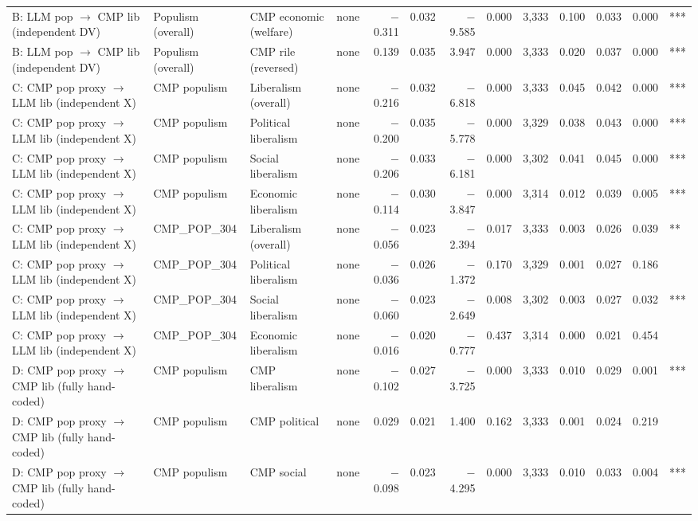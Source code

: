 \begin{table}[ht]
{\begin{tabular}{llllrrrrrrrrl}
B: LLM pop $\rightarrow$ CMP lib (independent DV) & Populism (overall) & CMP economic (welfare) & none & $-$0.311 & 0.032 & $-$9.585 & 0.000 & 3,333 & 0.100 & 0.033 & 0.000 & *** \\
B: LLM pop $\rightarrow$ CMP lib (independent DV) & Populism (overall) & CMP rile (reversed) & none & 0.139 & 0.035 & 3.947 & 0.000 & 3,333 & 0.020 & 0.037 & 0.000 & *** \\
C: CMP pop proxy $\rightarrow$ LLM lib (independent X) & CMP populism & Liberalism (overall) & none & $-$0.216 & 0.032 & $-$6.818 & 0.000 & 3,333 & 0.045 & 0.042 & 0.000 & *** \\
C: CMP pop proxy $\rightarrow$ LLM lib (independent X) & CMP populism & Political liberalism & none & $-$0.200 & 0.035 & $-$5.778 & 0.000 & 3,329 & 0.038 & 0.043 & 0.000 & *** \\
C: CMP pop proxy $\rightarrow$ LLM lib (independent X) & CMP populism & Social liberalism & none & $-$0.206 & 0.033 & $-$6.181 & 0.000 & 3,302 & 0.041 & 0.045 & 0.000 & *** \\
C: CMP pop proxy $\rightarrow$ LLM lib (independent X) & CMP populism & Economic liberalism & none & $-$0.114 & 0.030 & $-$3.847 & 0.000 & 3,314 & 0.012 & 0.039 & 0.005 & *** \\
C: CMP pop proxy $\rightarrow$ LLM lib (independent X) & CMP\_POP\_304 & Liberalism (overall) & none & $-$0.056 & 0.023 & $-$2.394 & 0.017 & 3,333 & 0.003 & 0.026 & 0.039 & ** \\
C: CMP pop proxy $\rightarrow$ LLM lib (independent X) & CMP\_POP\_304 & Political liberalism & none & $-$0.036 & 0.026 & $-$1.372 & 0.170 & 3,329 & 0.001 & 0.027 & 0.186 &  \\
C: CMP pop proxy $\rightarrow$ LLM lib (independent X) & CMP\_POP\_304 & Social liberalism & none & $-$0.060 & 0.023 & $-$2.649 & 0.008 & 3,302 & 0.003 & 0.027 & 0.032 & *** \\
C: CMP pop proxy $\rightarrow$ LLM lib (independent X) & CMP\_POP\_304 & Economic liberalism & none & $-$0.016 & 0.020 & $-$0.777 & 0.437 & 3,314 & 0.000 & 0.021 & 0.454 &  \\
D: CMP pop proxy $\rightarrow$ CMP lib (fully hand-coded) & CMP populism & CMP liberalism & none & $-$0.102 & 0.027 & $-$3.725 & 0.000 & 3,333 & 0.010 & 0.029 & 0.001 & *** \\
D: CMP pop proxy $\rightarrow$ CMP lib (fully hand-coded) & CMP populism & CMP political & none & 0.029 & 0.021 & 1.400 & 0.162 & 3,333 & 0.001 & 0.024 & 0.219 &  \\
D: CMP pop proxy $\rightarrow$ CMP lib (fully hand-coded) & CMP populism & CMP social & none & $-$0.098 & 0.023 & $-$4.295 & 0.000 & 3,333 & 0.010 & 0.033 & 0.004 & *** \\

\end{tabular}}
\end{table}
